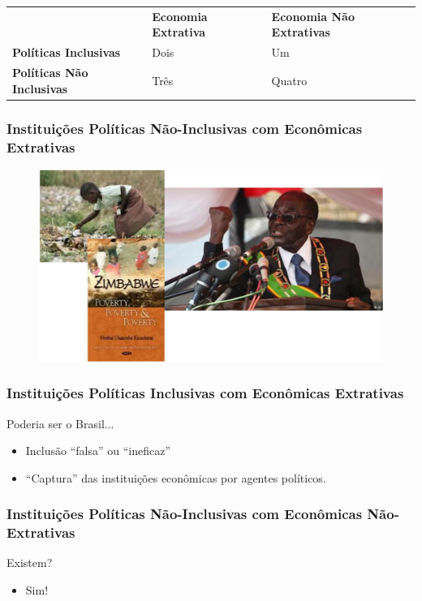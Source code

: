 \documentclass[a4paper,12pt]{article}[abntex2]
\begin{document}
\begin{table}[H]
\begin{tabular}{lll}
                                  & \textbf{Economia Extrativa} & \textbf{Economia Não Extrativas} \\
\textbf{Políticas Inclusivas}     & Dois                        & Um                               \\
\textbf{Políticas Não Inclusivas} & Três                        & Quatro                          
\end{tabular}
\end{table}


\subsubsection{\textbf{Instituições Políticas Não-Inclusivas com Econômicas Extrativas}}
\begin{figure}[H]
    \centering
    \includegraphics[width=0.5\linewidth]{Imagens/a2i4.png}
\end{figure}

\subsubsection{\textbf{Instituições Políticas Inclusivas com Econômicas Extrativas}}
Poderia ser o Brasil... \begin{itemize}
    \item Inclusão “falsa” ou “ineficaz”
    \item “Captura” das instituições econômicas por agentes políticos.
\end{itemize}

\subsubsection{\textbf{Instituições Políticas Não-Inclusivas com Econômicas Não-Extrativas}}
Existem?\begin{itemize}
    \item Sim!
\end{itemize}
\end{document}
